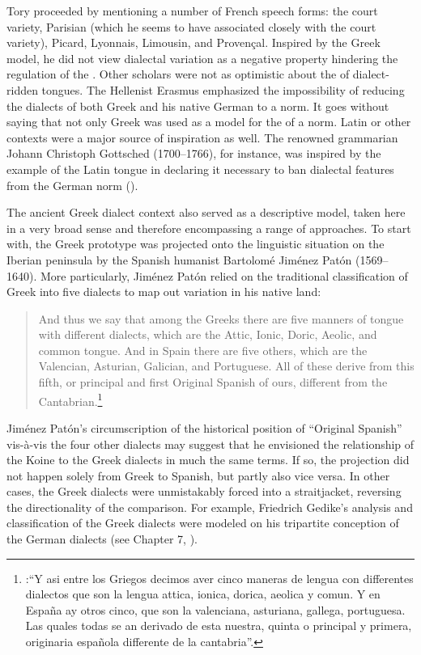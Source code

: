 Tory proceeded by mentioning a number of French speech forms: the court variety, Parisian (which he seems to have associated closely with the court variety), Picard, Lyonnais, Limousin, and Provençal. Inspired by the Greek model, he did not view dialectal variation as a negative property hindering the regulation of the . Other scholars were not as optimistic about the  of dialect-ridden tongues. The Hellenist Erasmus \citet[239]{Schmidt1615} emphasized the impossibility of reducing the dialects of both Greek and his native German to a norm. It goes without saying that not only Greek was used as a model for the  of a norm. Latin or other  contexts were a major source of inspiration as well. The renowned grammarian Johann Christoph Gottsched (1700–1766), for instance, was inspired by the example of the Latin tongue in declaring it necessary to ban dialectal features from the German norm (\citeyear[334]{Gottsched1748}).

The ancient Greek dialect context also served as a descriptive model, taken here in a very broad sense and therefore encompassing a range of approaches. To start with, the Greek prototype was projected onto the linguistic situation on the Iberian peninsula by the Spanish humanist Bartolomé Jiménez Patón (1569–1640). More particularly, Jiménez Patón relied on the traditional classification of Greek into five dialects to map out variation in his native land:

\begin{quote}
And thus we say that among the Greeks there are five manners of tongue with different dialects, which are the Attic, Ionic, Doric, Aeolic, and common tongue. And in Spain there are five others, which are the Valencian, Asturian, Galician, and Portuguese. All of these derive from this fifth, or principal and first Original Spanish of ours, different from the Cantabrian.\footnote{\citet[10\textsc{\textsuperscript{r}}\textsc{–10}\textsc{\textsuperscript{v}}]{Jimenez1604}:“Y asi entre los Griegos decimos aver cinco maneras de lengua con differentes dialectos que son la lengua attica, ionica, dorica, aeolica y comun. Y en España ay otros cinco, que son la valenciana, asturiana, gallega, portuguesa. Las quales todas se an derivado de esta nuestra, quinta o principal y primera, originaria española differente de la cantabria”.}
\end{quote}

Jiménez Patón’s circumscription of the historical position of “Original Spanish” vis-à-vis the four other dialects may suggest that he envisioned the relationship of the Koine to the Greek dialects in much the same terms. If so, the projection did not happen solely from Greek to Spanish, but partly also vice versa. In other cases, the Greek dialects were unmistakably forced into a  straitjacket, reversing the directionality of the comparison. For example, Friedrich Gedike’s analysis and classification of the Greek dialects were modeled on his tripartite conception of the German dialects (see Chapter 7, ).

